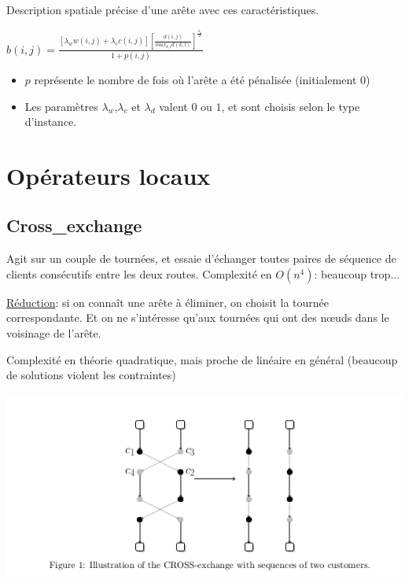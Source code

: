 \documentclass{beamer}
\begin{document}
\begin{frame}
Description spatiale précise d'une arête avec ces caractéristiques. 
\begin{center}
$b(i,j) = \frac{[\lambda_w w(i,j) + \lambda_c c(i,j)] [\frac{d(i,j)}{max_{k,l}d(k,l)}] ^ {\frac{\lambda_d}{2}}}{1+p(i,j)}$
\end{center}

\begin{itemize}
\item $p$ représente le nombre de fois où l'arête a été pénalisée (initialement 0)

\item Les paramètres $\lambda_w$,$\lambda_c$ et $\lambda_d$ valent $0$ ou $1$, et sont choisis selon le type d'instance. 
\end{itemize}

\end{frame}

\section{Opérateurs locaux}

\subsection{Cross\_exchange}
\begin{frame}
Agit sur un couple de tournées, et essaie d'échanger toutes paires de séquence de clients consécutifs entre les deux routes. Complexité en $O(n^4)$: beaucoup trop...

\underline{Réduction}: si on connaît une arête à éliminer, on choisit la tournée correspondante. Et on ne s'intéresse qu'aux tournées qui ont des n\oe uds dans le voisinage de l'arête.

Complexité en théorie quadratique, mais proche de linéaire en général (beaucoup de solutions violent les contraintes)

	\centering
	\includegraphics[height=0.4\textheight]{cross_exchange.png}
\end{frame}
\end{document}
